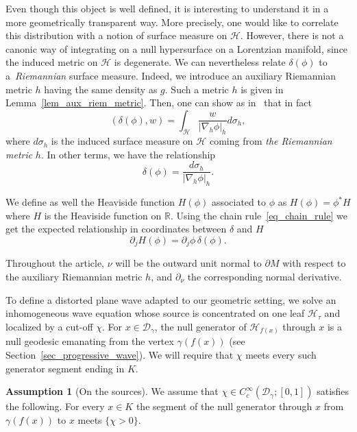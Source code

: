 \documentclass[12pt,reqno]{amsart}
\numberwithin{equation}{section}
\theoremstyle{definition}
\theoremstyle{plain}
\theoremstyle{definition}
\theoremstyle{definition}
\newtheorem{assumption}[theorem]{Assumption}
\newcommand{\R}{\mathbb{R}}
\newcommand{\n}{\mathcal{H}}
\newcommand{\D}{\mathcal{D}}
\newcommand{\dg}{\D_\gamma}
\newcommand{\uu}{M}
\def\R{\mathbb R}
\begin{document}
Even though this object is well defined, it is interesting to understand it in a more geometrically transparent way. More precisely, one would like to correlate this distribution with a notion of surface measure on $\n$. However, there is not a canonic way of integrating on a null hypersurface on a Lorentzian manifold, since the induced metric on $\n$ is degenerate. We can nevertheless relate $\delta(\phi)$ to a~\textit{Riemannian} surface measure. Indeed, we introduce an auxiliary Riemannian metric $h$ having the same density as $g$. Such a metric $h$ is given in Lemma~\ref{lem_aux_riem_metric}. Then, one can show as in~\cite[Theorem 6.1.5]{hormander1990} that in fact
\begin{equation}
    (\delta(\phi), w)=\int_\n \frac{w}{|\nabla_h \phi|_h} d \sigma_h,
\end{equation}
 where $d\sigma_h$ is the induced surface measure on $\n$ coming from \textit{the Riemannian metric } $h$. In other terms, we have the relationship
 \begin{equation}
     \delta(\phi)=\frac{d \sigma_h}{|\nabla_h \phi|_h}.
 \end{equation}

 We define as well the Heaviside function $H(\phi)$ associated to $\phi$ as $H(\phi)=\phi^*{H}$ where $H$ is the Heaviside function on $\R$. Using the chain rule~\eqref{eq_chain_rule} we get the expected relationship in coordinates between $\delta$ and $H$
 \begin{equation}
     \partial_jH(\phi)=\partial_j \phi\, \delta(\phi).
 \end{equation}

Throughout the article, $\nu$ will be the outward unit normal to $\partial\uu$ with respect to the auxiliary Riemannian metric $h$, and $\partial_\nu$ the corresponding normal derivative.

\bigskip


To define a distorted plane wave adapted to our geometric setting, we solve an inhomogeneous wave equation whose source is concentrated on one leaf $\mathcal H_\tau$ and localized by a cut-off $\chi$. For $x\in\dg$, the null generator of $\mathcal H_{f(x)}$ through $x$ is a null geodesic emanating from the vertex $\gamma(f(x))$ (see Section~\ref{sec_progressive_wave}). We will require that $\chi$ meets every such generator segment ending in $K$.

\begin{assumption}[On the sources]\label{assumption_sources}
We assume that $\chi\in C^\infty_c(\dg; [0,1])$ satisfies the following. For every $x\in K$ the segment of the null generator through $x$ from $\gamma(f(x))$ to $x$ meets $\{\chi>0\}$.
\end{assumption}
\end{document}
